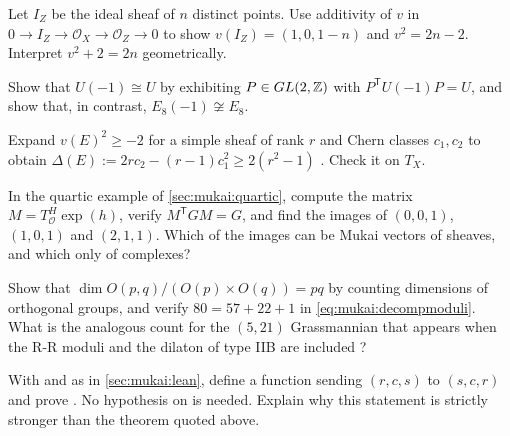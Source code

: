 \begin{exercise}[$\star$]\label{exo:mukai:ideal}
Let $I_Z$ be the ideal sheaf of $n$ distinct points. Use additivity of $v$ in
$0\to I_Z\to\mathcal O_X\to\mathcal O_Z\to0$ to show $v(I_Z)=(1,0,1-n)$ and $v^2=2n-2$. Interpret
$v^2+2=2n$ geometrically.
\end{exercise}

\begin{exercise}[$\star$]\label{exo:mukai:uneg}
Show that $U(-1)\cong U$ by exhibiting $P\in GL(2,\mathbb{Z})$ with $P^{\mathsf T}U(-1)P=U$, and show
that, in contrast, $E_8(-1)\not\cong E_8$.
\end{exercise}

\begin{exercise}[$\star\star$]\label{exo:mukai:bogomolov}
Expand $v(E)^2\ge-2$ for a simple sheaf of rank $r$ and Chern classes $c_1,c_2$ to obtain
$\Delta(E):=2rc_2-(r-1)c_1^2\ge2(r^2-1)$ . Check it
on $T_X$.
\end{exercise}

\begin{exercise}[$\star\star$]\label{exo:mukai:order}
In the quartic example of \cref{sec:mukai:quartic}, compute the matrix
$M=T^H_{\mathcal O}\exp(h)$, verify $M^{\mathsf T}GM=G$, and find the images of $(0,0,1)$,
$(1,0,1)$ and $(2,1,1)$. Which of the images can be Mukai vectors of sheaves, and which only of
complexes?
\end{exercise}

\begin{exercise}[$\star\star$]\label{exo:mukai:count}
Show that $\dim O(p,q)/(O(p)\times O(q))=pq$ by counting dimensions of orthogonal groups, and
verify $80=57+22+1$ in \eqref{eq:mukai:decompmoduli}. What is the analogous count for the
$(5,21)$ Grassmannian that appears when the R-R moduli and the dilaton of type IIB are included
?
\end{exercise}

\begin{exercise}\label{exo:mukai:leanswap}
With  and  as in \cref{sec:mukai:lean}, define
a function  sending $(r,c,s)$ to $(s,c,r)$ and prove
. No hypothesis on  is needed.
Explain why this statement is strictly stronger than the theorem
 quoted above.
\end{exercise}

